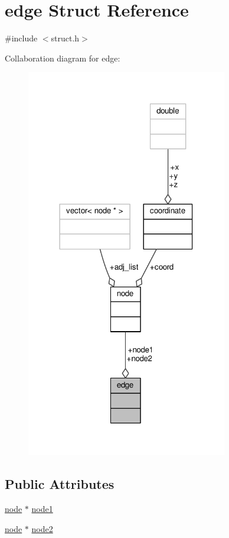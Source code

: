 \hypertarget{structedge}{}\section{edge Struct Reference}
\label{structedge}


{\ttfamily \#include $<$struct.\+h$>$}



Collaboration diagram for edge\+:
\nopagebreak
\begin{figure}[H]
\begin{center}
\leavevmode
\includegraphics[width=249pt]{structedge__coll__graph}
\end{center}
\end{figure}
\subsection*{Public Attributes}
\begin{DoxyCompactItemize}
\item 
\hyperlink{structnode}{node} $\ast$ \hyperlink{structedge_a433dede2d887d02126fefe4d906c6256}{node1}
\item 
\hyperlink{structnode}{node} $\ast$ \hyperlink{structedge_a7afb2c92f4e69ab33b0820ff51706a2f}{node2}
\end{DoxyCompactItemize}


